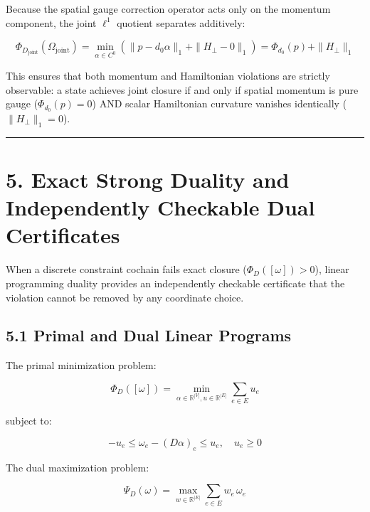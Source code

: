 \documentclass[11pt]{article}
\begin{document}
Because the spatial gauge correction operator acts only on the momentum component, the joint $\ell^1$ quotient separates additively:

\begin{equation*}
\Phi_{D_{\mathrm{joint}}}(\Omega_{\mathrm{joint}}) = \min_{\alpha \in C^0} \left( \|p - d_0 \alpha\|_1 + \|H_\perp - 0\|_1 \right) = \Phi_{d_0}(p) + \|H_\perp\|_1
\end{equation*}

This ensures that both momentum and Hamiltonian violations are strictly observable: a state achieves joint closure if and only if spatial momentum is pure gauge ($\Phi_{d_0}(p) = 0$) AND scalar Hamiltonian curvature vanishes identically ($\|H_\perp\|_1 = 0$).

\medskip\hrule\medskip
\section{\texorpdfstring{5. Exact Strong Duality and Independently Checkable Dual Certificates}{5. Exact Strong Duality and Independently Checkable Dual Certificates}}

When a discrete constraint cochain fails exact closure ($\Phi_D([\omega]) > 0$), linear programming duality provides an independently checkable certificate that the violation cannot be removed by any coordinate choice.

\subsection{\texorpdfstring{5.1 Primal and Dual Linear Programs}{5.1 Primal and Dual Linear Programs}}

The primal minimization problem:

\begin{equation*}
\Phi_D([\omega]) = \min_{\alpha \in \mathbb{R}^{|V|}, u \in \mathbb{R}^{|E|}} \sum_{e \in E} u_e
\end{equation*}

subject to:

\begin{equation*}
-u_e \le \omega_e - (D \alpha)_e \le u_e, \quad u_e \ge 0
\end{equation*}

The dual maximization problem:

\begin{equation*}
\Psi_D(\omega) = \max_{w \in \mathbb{R}^{|E|}} \sum_{e \in E} w_e \, \omega_e
\end{equation*}
\end{document}
